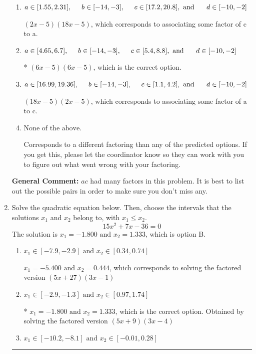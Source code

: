 \documentclass{extbook}[14pt]
\newcommand{\litem}[1]{\item #1

\rule{\textwidth}{0.4pt}}
\begin{document}
\begin{enumerate}
{\begin{enumerate}[label=\Alph*.]
 $(x -30)(x -30)$, which corresponds to factoring $x^{2} -60 x + 900$.
\item \( a \in [1.55, 2.31], \hspace*{5mm} b \in [-14, -3], \hspace*{5mm} c \in [17.2, 20.8], \text{ and } \hspace*{5mm} d \in [-10, -2] \)

 $(2x -5)(18x -5)$, which corresponds to associating some factor of c to a.
\item \( a \in [4.65, 6.7], \hspace*{5mm} b \in [-14, -3], \hspace*{5mm} c \in [5.4, 8.8], \text{ and } \hspace*{5mm} d \in [-10, -2] \)

* $(6x -5)(6x -5)$, which is the correct option.
\item \( a \in [16.99, 19.36], \hspace*{5mm} b \in [-14, -3], \hspace*{5mm} c \in [1.1, 4.2], \text{ and } \hspace*{5mm} d \in [-10, -2] \)

 $(18x -5)(2x -5)$, which corresponds to associating some factor of a to c.
\item \( \text{None of the above.} \)

 Corresponds to a different factoring than any of the predicted options. If you get this, please let the coordinator know so they can work with you to figure out what went wrong with your factoring.
\end{enumerate}

\textbf{General Comment:} $ac$ had many factors in this problem. It is best to list out the possible pairs in order to make sure you don't miss any.
}
\litem{
Solve the quadratic equation below. Then, choose the intervals that the solutions $x_1$ and $x_2$ belong to, with $x_1 \leq x_2$.
\[ 15x^{2} +7 x -36 = 0 \]The solution is \( x_1 = -1.800 \text{ and } x_2 = 1.333 \), which is option B.\begin{enumerate}[label=\Alph*.]
\item \( x_1 \in [-7.9, -2.9] \text{ and } x_2 \in [0.34, 0.74] \)

$x_1 = -5.400 \text{ and } x_2 = 0.444$, which corresponds to solving the factored version $(5x + 27)(3x -1)$
\item \( x_1 \in [-2.9, -1.3] \text{ and } x_2 \in [0.97, 1.74] \)

* $x_1 = -1.800 \text{ and } x_2 = 1.333$, which is the correct option. Obtained by solving the factored version $(5x + 9)(3x -4)$
\item \( x_1 \in [-10.2, -8.1] \text{ and } x_2 \in [-0.01, 0.28] \)


\end{enumerate}}
\end{enumerate}
\end{document}
